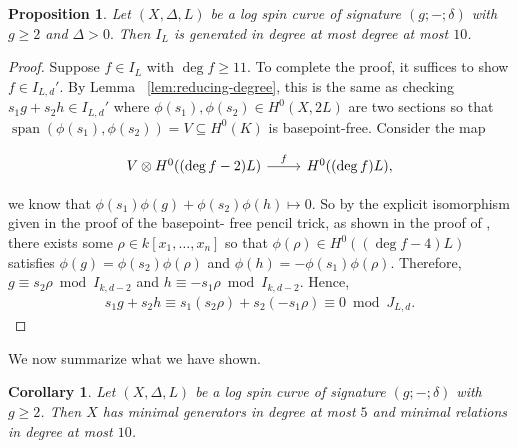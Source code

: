 \documentclass{amsart}
\theoremstyle{plain}
\newtheorem{prop}[thm]{Proposition}
\newtheorem{cor}[thm]{Corollary}
\theoremstyle{definition}
\theoremstyle{remark}
\newtheorem{rem}[thm]{Remark}
\numberwithin{equation}{section}
\newcommand{\halfcan}{L}
\DeclareMathOperator{\newspan}{span}
\begin{document}
\begin{prop}
\label{prop:relation-10}
Let $(X, \Delta, \halfcan)$ be a log spin curve of signature $(g; -; \delta)$
 with $g \geq 2$ and $\Delta > 0.$ Then $I_\halfcan$ is generated in
degree at most degree at most $10$.
\end{prop}
\begin{proof}
Suppose $f \in I_\halfcan$ with $\deg f \geq 11$. To complete the proof,
it suffices to show $f \in I_{\halfcan,d}'$. By Lemma
~\ref{lem:reducing-degree}, this is the same as checking $s_1 g + s_2 h \in
I_{\halfcan, d}'$ where $\phi(s_ 1),\phi(s_2) \in H^0(X, 2L)$ are two sections
so that $\newspan(\phi(s_ 1), \phi(s_2)) = V \subseteq H^0(K)$ is
basepoint-free. Consider the map

$$\begin{tikzcd}
V \otimes H^0((\deg f - 2)L) \ar {r}{f} & H^0((\deg f)L),
\end{tikzcd}$$

\noindent
we know that $\phi(s_1)\phi(g) + \phi(s_2) \phi(h) \mapsto 0$.
So by the explicit isomorphism given in the proof of the basepoint-
free pencil trick, as shown in the proof of \cite[Lemma 2.6]
{saint-donat:proj}, there exists some $\rho \in k[x_1, \ldots, x_n]$
so that $\phi(\rho) \in H^0((\deg f - 4)L)$ satisfies $\phi(g) =
\phi(s_2) \phi(\rho)$ and $\phi(h) = -\phi(s_1)\phi(\rho)$. 
Therefore,
$g \equiv s_2 \rho \bmod I_{k,d-2}$ and $h \equiv - s_1 \rho \bmod
I_{k, d - 2}$. Hence,
\begin{align*}
	s_1g + s_2h \equiv s_1(s_2\rho) + s_2(-s_1 \rho) \equiv 0 \bmod J_
{L,d}.
\end{align*}
\end{proof}


We now summarize what we have shown.

\begin{cor}
\label{cor:g-2-presentation-bound}
Let $(X, \Delta, L)$ be a log spin curve of signature $(g;-;\delta)$
with $g \geq 2$. Then $X$ has minimal generators in degree at most
$5$ and minimal relations in degree at most $10$.
\end{cor}
\end{document}
